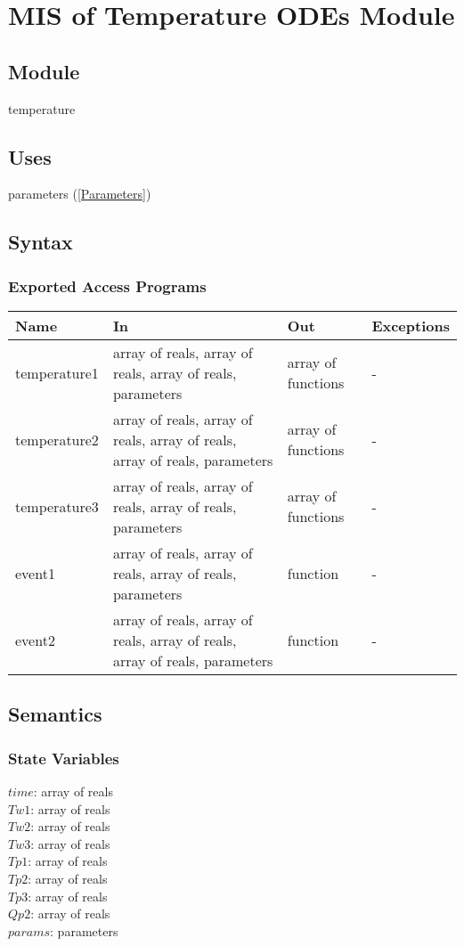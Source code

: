 \documentclass[12pt]{article}
\begin{document}
\section{MIS of Temperature ODEs Module} \label{Temperature}
\subsection{Module}
temperature
\subsection{Uses}
parameters (\ref{Parameters})
\subsection{Syntax}
\subsubsection{Exported Access Programs}
\begin{center}
\begin{tabular}{p{3cm} p{5cm} p{4cm} p{2cm}}
\hline
\textbf{Name} & \textbf{In} & \textbf{Out} & \textbf{Exceptions} \\
\hline
temperature1 & array of reals, array of reals, array of reals, parameters & array of functions & - \\
\hline
temperature2 & array of reals, array of reals, array of reals, array of reals, parameters & array of functions & - \\
\hline
temperature3 & array of reals, array of reals, array of reals, parameters & array of functions & - \\
\hline
event1 & array of reals, array of reals, array of reals, parameters & function & - \\
\hline
event2 & array of reals, array of reals, array of reals, array of reals, parameters & function & - \\
\hline
\end{tabular}
\end{center}
\subsection{Semantics}
\subsubsection{State Variables}
$time$: array of reals \\
$Tw1$: array of reals \\
$Tw2$: array of reals \\
$Tw3$: array of reals \\
$Tp1$: array of reals \\
$Tp2$: array of reals \\
$Tp3$: array of reals \\
$Qp2$: array of reals \\
$params$: parameters
\end{document}
